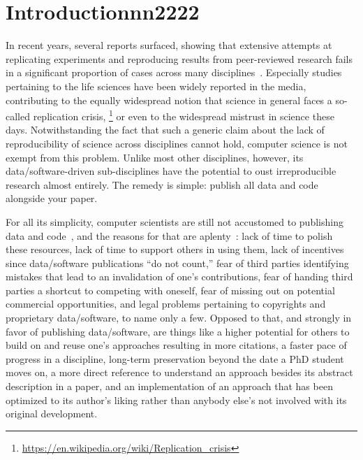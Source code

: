 \section{Introductionnn2222}

In recent years, several reports surfaced, showing that extensive attempts at replicating experiments and reproducing results from peer-reviewed research fails in a significant proportion of cases across many disciplines~\cite{ionnadis:2005,anderson:2017}. Especially studies pertaining to the life sciences have been widely reported in the media, contributing to the equally widespread notion that science in general faces a so-called replication crisis,%
\footnote{\scriptsize\url{https://en.wikipedia.org/wiki/Replication_crisis}}
or even to the widespread mistrust in science these days. Notwithstanding the fact that such a generic claim about the lack of reproducibility of science across disciplines cannot hold, computer science is not exempt from this problem. Unlike most other disciplines, however, its data/software-driven sub-disciplines have the potential to oust irreproducible research almost entirely. The remedy is simple: publish all data and code alongside your paper.

For all its simplicity, computer scientists are still not accustomed to publishing data and code~\cite{collberg:2015}, and the reasons for that are aplenty~\cite{stodden:2010}: lack of time to polish these resources, lack of time to support others in using them, lack of incentives since data/software publications ``do not count,'' fear of third parties identifying mistakes that lead to an invalidation of one's contributions, fear of handing third parties a shortcut to competing with oneself, fear of missing out on potential commercial opportunities, and legal problems pertaining to copyrights and proprietary data/software, to name only a few.
Opposed to that, and strongly in favor of publishing data/software, are things like a higher potential for others to build on and reuse one's approaches resulting in more citations, a faster pace of progress in a discipline, long-term preservation beyond the date a PhD student moves on, a more direct reference to understand an approach besides its abstract description in a paper, and an implementation of an approach that has been optimized to its author's liking rather than anybody else's not involved with its original development.

